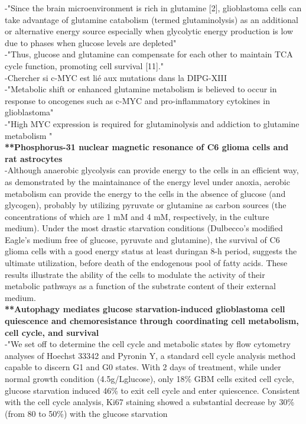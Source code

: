 \documentclass[11pt,a4paper]{article}
\begin{document}
-"Since the brain microenvironment is rich in glutamine [2], glioblastoma cells can take advantage of glutamine catabolism (termed glutaminolysis) as an additional or alternative energy source especially when glycolytic energy production is low due to phases when glucose levels are depleted"\\

-"Thus, glucose and glutamine can compensate for each other to maintain TCA cycle function, promoting cell survival [11]."\\

-Chercher si c-MYC est lié aux mutations dans la DIPG-XIII\\

-"Metabolic shift or enhanced glutamine metabolism is believed to occur in response to oncogenes such as c-MYC and pro-inflammatory cytokines in glioblastoma"\\

-"High MYC expression is required for glutaminolysis and addiction to glutamine metabolism "\\

\textbf{**Phosphorus-31 nuclear magnetic resonance of C6 glioma cells and rat astrocytes}\\

-Although anaerobic glycolysis can provide energy to the cells in an efficient way, as demonstrated by the maintainance of the energy level under anoxia, aerobic metabolism
can provide the energy to the cells in the absence of glucose (and glycogen), probably by utilizing pyruvate or glutamine as carbon sources (the concentrations of which are 1 mM and 4 mM, respectively, in the culture medium). Under the most drastic starvation conditions (Dulbecco’s modified Eagle’s medium free of glucose, pyruvate and glutamine), the survival of C6 glioma cells with a good energy status at least duringan 8-h period, suggests the ultimate utilization, before death of the endogenous pool of fatty acids. These results illustrate the ability of the cells to modulate the activity of their metabolic pathways as a function of the substrate content of their external medium.\\

\textbf{**Autophagy mediates glucose starvation-induced glioblastoma cell quiescence and chemoresistance through coordinating cell metabolism, cell cycle, and survival}\\

-"We set off to determine the cell cycle and metabolic states 
by flow cytometry analyses of Hoechst 33342 and Pyronin Y, a 
standard cell cycle analysis method capable to discern G1 and 
G0 states. With 2 days of treatment, while under normal growth 
condition (4.5g/Lglucose), only 18\% GBM cells exited cell 
cycle, glucose starvation induced 46\% to exit cell cycle and 
enter quiescence. Consistent with the cell cycle analysis, Ki67 
staining showed a substantial decrease by 30\% (from 80 to 
50\%) with the glucose starvation 
\end{document}
